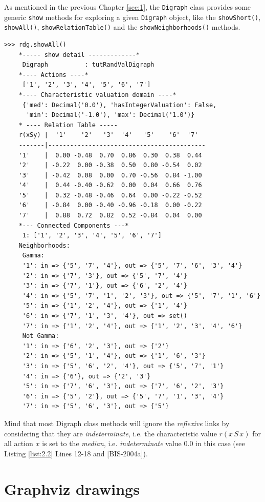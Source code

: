 As mentioned in the previous Chapter \ref{sec:1}, the {\tt Digraph} class provides some generic {\tt show} methods for exploring a given {\tt Digraph} object, like the {\tt showShort()}, {\tt showAll()}, {\tt showRelationTable()} and the {\tt showNeighborhoods()} methods.
\begin{lstlisting}[caption={Example of random valuation digraph},label=list:2.2]
   >>> rdg.showAll()
    *----- show detail -------------*
     Digraph          : tutRandValDigraph
    *---- Actions ----*
     ['1', '2', '3', '4', '5', '6', '7']
    *---- Characteristic valuation domain ----*
     {'med': Decimal('0.0'), 'hasIntegerValuation': False, 
      'min': Decimal('-1.0'), 'max': Decimal('1.0')}
    * ---- Relation Table -----
    r(xSy) |  '1'    '2'   '3'  '4'   '5'    '6'  '7'	  
    -------|-------------------------------------------
    '1'    |  0.00 -0.48  0.70  0.86  0.30  0.38  0.44	 
    '2'    | -0.22  0.00 -0.38  0.50  0.80 -0.54  0.02	 
    '3'    | -0.42  0.08  0.00  0.70 -0.56  0.84 -1.00	 
    '4'    |  0.44 -0.40 -0.62  0.00  0.04  0.66  0.76	 
    '5'    |  0.32 -0.48 -0.46  0.64  0.00 -0.22 -0.52	 
    '6'    | -0.84  0.00 -0.40 -0.96 -0.18  0.00 -0.22	 
    '7'    |  0.88  0.72  0.82  0.52 -0.84  0.04  0.00
    *--- Connected Components ---*
     1: ['1', '2', '3', '4', '5', '6', '7']
    Neighborhoods:
     Gamma:
     '1': in => {'5', '7', '4'}, out => {'5', '7', '6', '3', '4'}
     '2': in => {'7', '3'}, out => {'5', '7', '4'}
     '3': in => {'7', '1'}, out => {'6', '2', '4'}
     '4': in => {'5', '7', '1', '2', '3'}, out => {'5', '7', '1', '6'}
     '5': in => {'1', '2', '4'}, out => {'1', '4'}
     '6': in => {'7', '1', '3', '4'}, out => set()
     '7': in => {'1', '2', '4'}, out => {'1', '2', '3', '4', '6'}
     Not Gamma:
     '1': in => {'6', '2', '3'}, out => {'2'}
     '2': in => {'5', '1', '4'}, out => {'1', '6', '3'}
     '3': in => {'5', '6', '2', '4'}, out => {'5', '7', '1'}
     '4': in => {'6'}, out => {'2', '3'}
     '5': in => {'7', '6', '3'}, out => {'7', '6', '2', '3'}
     '6': in => {'5', '2'}, out => {'5', '7', '1', '3', '4'}
     '7': in => {'5', '6', '3'}, out => {'5'}
\end{lstlisting}   
Mind that most Digraph class methods will ignore the \emph{reflexive} links by considering that they are \emph{indeterminate}, i.e. the characteristic value $r(x\,S\,x)$ for all action $x$ is set to the \emph{median}, i.e. \emph{indeterminate} value $0.0$ in this case (see Listing \ref{list:2.2} Lines 12-18 and [BIS-2004a]).

\section{Graphviz drawings}
\label{sec:2.2}

